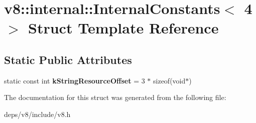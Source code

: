 \hypertarget{structv8_1_1internal_1_1_internal_constants_3_014_01_4}{}\section{v8\+:\+:internal\+:\+:Internal\+Constants$<$ 4 $>$ Struct Template Reference}
\label{structv8_1_1internal_1_1_internal_constants_3_014_01_4}
\subsection*{Static Public Attributes}
\begin{DoxyCompactItemize}
\item 
\hypertarget{structv8_1_1internal_1_1_internal_constants_3_014_01_4_a08da692ed2a8b9ec59d9e9a07212bdd3}{}static const int {\bfseries k\+String\+Resource\+Offset} = 3 $\ast$ sizeof(void$\ast$)\label{structv8_1_1internal_1_1_internal_constants_3_014_01_4_a08da692ed2a8b9ec59d9e9a07212bdd3}

\end{DoxyCompactItemize}


The documentation for this struct was generated from the following file\+:\begin{DoxyCompactItemize}
\item 
deps/v8/include/v8.\+h\end{DoxyCompactItemize}
